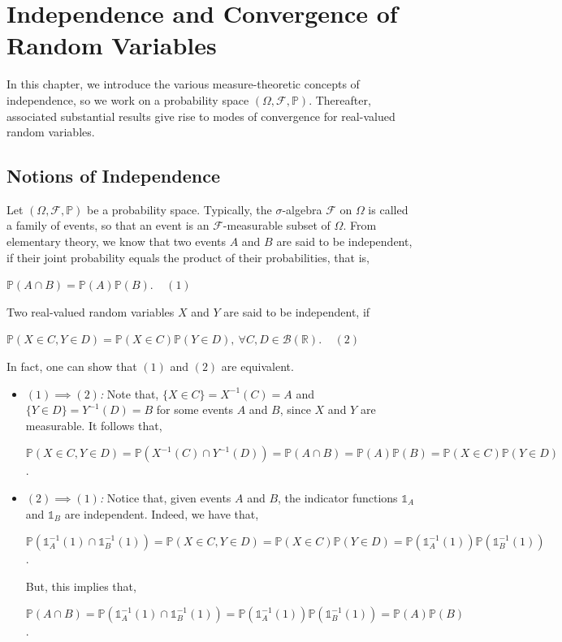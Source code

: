 \documentclass{article}
\begin{document}
\section{Independence and Convergence of Random Variables}
In this chapter, we introduce the various measure-theoretic concepts of independence, so we work on a probability space $(\Omega,\mathcal{F},\mathbb{P})$. Thereafter, associated substantial results give rise to modes of convergence for real-valued random variables.
\subsection{Notions of Independence}
Let $(\Omega,\mathcal{F},\mathbb{P})$ be a probability space. Typically, the $\sigma$-algebra $\mathcal{F}$ on $\Omega$ is called a family of events, so that an event is an $\mathcal{F}$-measurable subset of $\Omega$. From elementary theory, we know that two events $A$ and $B$ are said to be independent, if their joint probability equals the product of their probabilities, that is,
\begin{center}
	$\mathbb{P}(A \cap B) = \mathbb{P}(A)\mathbb{P}(B). \ \ \ \ \ (1)$
\end{center}
Two real-valued random variables $X$ and $Y$ are said to be independent, if
\begin{center}
	$\mathbb{P}(X \in C, Y \in D) = \mathbb{P}(X \in C)\mathbb{P}(Y \in D), \ \forall C,D \in \mathcal{B}(\mathbb{R}). \ \ \ \ \ (2)$
\end{center}
In fact, one can show that $(1)$ and $(2)$ are equivalent.
\begin{itemize}
	\item \textit{$(1) \implies (2)$:} Note that, $\{X \in C\} = X^{-1}(C) = A$ and $ \{Y \in D\} = Y^{-1}(D) = B$ for some events $A$ and $B$, since $X$ and $Y$ are measurable. It follows that,
	\begin{center}
		$\mathbb{P}(X \in C, Y \in D) = \mathbb{P}(X^{-1}(C) \cap Y^{-1}(D)) = \mathbb{P}(A \cap B) = \mathbb{P}(A)\mathbb{P}(B) = \mathbb{P}(X \in C)\mathbb{P}(Y \in D)$.
	\end{center}
	\item \textit{$(2) \implies (1)$:} Notice that, given events $A$ and $B$, the indicator functions $\mathds{1}_{A}$ and $\mathds{1}_B$ are independent. Indeed, we have that,
	\begin{center}
		$\mathbb{P}(\mathds{1}_A^{-1}(1) \cap \mathds{1}_{B}^{-1}(1)) = \mathbb{P}(X \in C, Y \in D) = \mathbb{P}(X \in C)\mathbb{P}(Y \in D) = \mathbb{P}(\mathds{1}_A^{-1}(1))\mathbb{P}(\mathds{1}_B^{-1}(1))$.
	\end{center}
	But, this implies that,
	\begin{center}
		$\mathbb{P}(A \cap B) = \mathbb{P}(\mathds{1}_A^{-1}(1) \cap \mathds{1}_B^{-1}(1)) = \mathbb{P}(\mathds{1}_A^{-1}(1))\mathbb{P}(\mathds{1}_B^{-1}(1)) = \mathbb{P}(A)\mathbb{P}(B)$.
	\end{center}
\end{itemize}
\end{document}
